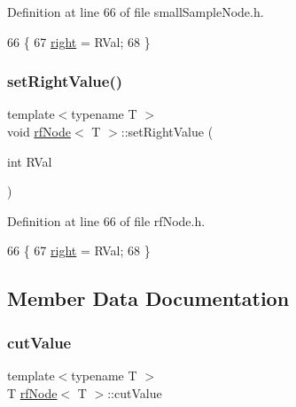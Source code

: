 Definition at line 66 of file small\+Sample\+Node.\+h.


\begin{DoxyCode}
66                                            \{
67             \hyperlink{classrfNode_a01e57d43ac8af60d16880544e99ed965}{right} = RVal;
68         \}
\end{DoxyCode}
\mbox{\label{classrfNode_a473dc8da457727bc50dea408320e6993}} 
\subsubsection{\texorpdfstring{set\+Right\+Value()}{setRightValue()}\hspace{0.1cm}{\footnotesize\ttfamily [2/2]}}
{\footnotesize\ttfamily template$<$typename T $>$ \\
void \hyperlink{classrfNode}{rf\+Node}$<$ T $>$\+::set\+Right\+Value (\begin{DoxyParamCaption}\item[{int}]{R\+Val }\end{DoxyParamCaption})\hspace{0.3cm}{\ttfamily [inline]}}



Definition at line 66 of file rf\+Node.\+h.


\begin{DoxyCode}
66                                            \{
67             \hyperlink{classrfNode_a01e57d43ac8af60d16880544e99ed965}{right} = RVal;
68         \}
\end{DoxyCode}


\subsection{Member Data Documentation}
\mbox{\label{classrfNode_a49b9c55f11f1f3898eb7811f78f68796}} 
\subsubsection{\texorpdfstring{cut\+Value}{cutValue}}
{\footnotesize\ttfamily template$<$typename T $>$ \\
T \hyperlink{classrfNode}{rf\+Node}$<$ T $>$\+::cut\+Value\hspace{0.3cm}{\ttfamily [protected]}}



